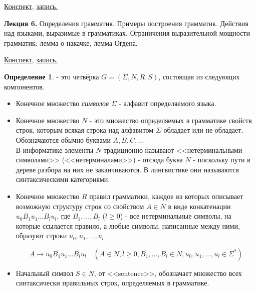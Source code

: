 \documentclass[a4paper]{article}
\newcommand{\mybox}{%
    \collectbox{%
        \setlength{\fboxsep}{1pt}%
        \fbox{\BOXCONTENT}%
    }%
}
\theoremstyle{indented}
\theoremstyle{definition}
\newtheorem{defn}{Определение}
\theoremstyle{remark}
\DeclareMathOperator{\ra}{\rightarrow}
\begin{document}
\begin{flushright}
    \mybox{
        \href{https://users.math-cs.spbu.ru/~okhotin/teaching/tcs_fl_2021/okhotin_tcs_fl_2021_l5.pdf}{Конспект,}
        \href{https://disk.yandex.ru/d/knoQ44wLmGDwwQ/2021-2022%20учебный%20год%20(осенний%20семестр)/2%20курс/Теоретическая%20информатика/M2021-09-29_111630_1h44m_102.mp4}{запись.}
    }
\end{flushright}

\textbf{Лекция 6.} Определения грамматик. Примеры построения грамматик. Действия над языками, выразимые в грамматиках. Ограничения выразительной мощности грамматик: лемма о накачке, лемма Огдена.

\begin{flushright}
    \mybox{
        \href{https://users.math-cs.spbu.ru/~okhotin/teaching/tcs_fl_2021/okhotin_tcs_fl_2021_l6.pdf}{Конспект,}
        \href{https://disk.yandex.ru/d/knoQ44wLmGDwwQ/2021-2022%20учебный%20год%20(осенний%20семестр)/2%20курс/Теоретическая%20информатика/M2021-10-06_111624_1h43m_102.mp4}{запись.}
    }
\end{flushright}

\begin{defn}
     - это четвёрка $G = (\Sigma, N, R, S)$, состоящая из следующих компонентов.

    \begin{itemize}
        \item Конечное множество \textit{символов} $\Sigma$ - алфавит определяемого языка.
        \item Конечное множество $N$ - это множество определяемых в грамматике свойств строк, которым всякая строка над алфавитом $\Sigma$ обладает или не обладает. Обозначаются обычно буквами $A, B, C, \ldots$ \\ 
        
        В информатике элементы $N$ традиционно называют <<нетерминальными символами>> (<<нетерминалами>>) - отсюда буква $N$ - поскольку пути в дереве разбора на них не заканчиваются. В лингвистике они называются синтаксическими категориями.
        \item Конечное множество $R$ правил грамматики, каждое из которых описывает возможную структуру строк со свойством $A \in N$ в виде конкатенации $u_0B_1u_1 \ldots B_lu_l$, где $B_1, \ldots , B_l$ ($l \geq 0$) - все нетерминальные символы, на которые ссылается правило, а любые символы, написанные между ними, образуют строки $u_0, u_1, \ldots , u_l$.
        
        \[
            A \ra u_0B_1u_1 \ldots B_lu_l \: \: \; \; (A \in N, l \geq 0, B_1,\ldots,B_l \in N, u_0,u_1,\ldots,u_l \in \Sigma^*)
        \]

        \item Начальный символ $S \in N$, от <<sentence>>, обозначает множество всех синтаксически правильных строк, определяемых в грамматике.
    \end{itemize}
\end{defn}
\end{document}
